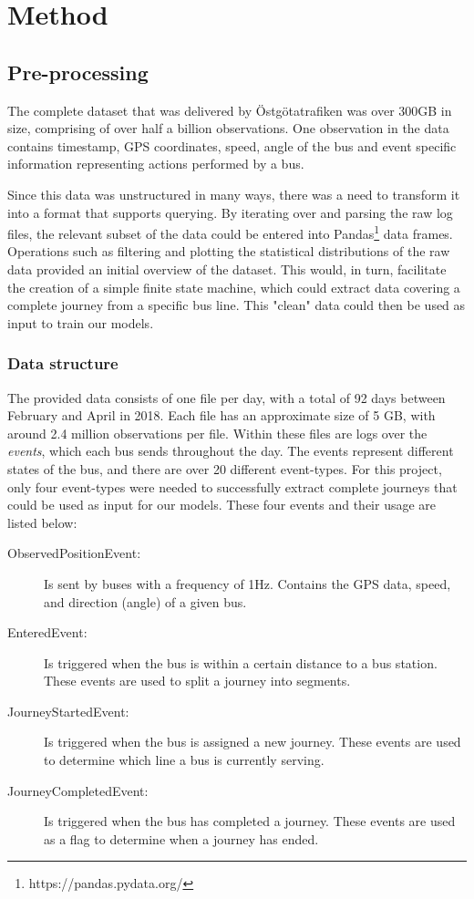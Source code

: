 
\chapter{Method}
\label{cha:method}

\section{Pre-processing}\label{pre-processing}
\label{sec:pre-processing}
The complete dataset that was delivered by Östgötatrafiken was over 300GB in size, comprising of over half a billion observations. One observation in the data contains timestamp, GPS coordinates, speed, angle of the bus and  event specific information representing actions performed by a bus. 

Since this data was unstructured in many ways, there was a need to transform it into a format that supports querying. By iterating over and parsing the raw log files, the relevant subset of the data could be entered into Pandas\footnote{https://pandas.pydata.org/} data frames. Operations such as filtering and plotting the statistical distributions of the raw data provided an initial overview of the dataset. This would, in turn, facilitate the creation of a simple finite state machine, which could extract data covering a complete journey from a specific bus line. This "clean" data could then be used as input to train our models.

\subsection{Data structure}
The provided data consists of one file per day, with a total of 92 days between February and April in 2018. Each file has an approximate size of 5 GB, with around 2.4 million observations per file. Within these files are logs over the \textit{events}, which each bus sends throughout the day. The events represent different states of the bus, and there are over 20 different event-types. For this project, only four event-types were needed to successfully extract complete journeys that could be used as input for our models. These four events and their usage are listed below:\\
\begin{description}
\item[ObservedPositionEvent:] Is sent by buses with a frequency of 1Hz. Contains the GPS data, speed, and direction (angle) of a given bus.
\item[EnteredEvent:] Is triggered when the bus is within a certain distance to a bus station. These events are used to split a journey into segments.
\item[JourneyStartedEvent:] Is triggered when the bus is assigned a new journey. These events are used to determine which line a bus is currently serving.
\item[JourneyCompletedEvent:] Is triggered when the bus has completed a journey. These events are used as a flag to determine when a journey has ended.
\end{description}

